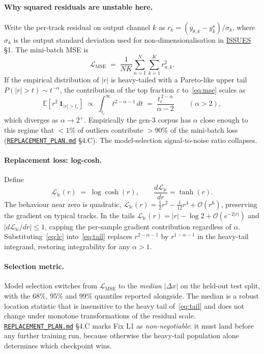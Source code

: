 \documentclass[11pt,a4paper]{article}
\newcommand{\loss}{\mathcal{L}}
\begin{document}
\paragraph{Why squared residuals are unstable here.} Write the per-track
residual on output channel $k$ as
$r_k = (y_{\theta,k} - y_k^\star)/\sigma_k$, where $\sigma_k$ is the output
standard deviation used for non-dimensionalisation in
\href{run:../../experiments/gen_2/ISSUES_WITH_PINNS_AND_RK_PINNS.md}{ISSUES} §1.
The mini-batch MSE is
\begin{equation}\label{eq:mse}
\loss_\mathrm{MSE} \;=\; \frac{1}{NK}\sum_{n=1}^{N}\sum_{k=1}^{K} r_{n,k}^{2}.
\end{equation}
If the empirical distribution of $|r|$ is heavy-tailed with a Pareto-like
upper tail $P(|r|>t)\sim t^{-\alpha}$, the contribution of the top
fraction $\varepsilon$ to~\eqref{eq:mse} scales as
\begin{equation}\label{eq:tail}
\mathbb{E}\!\left[r^2 \,\mathbf{1}_{|r|>t_\varepsilon}\right]
\;\propto\;
\int_{t_\varepsilon}^{\infty}\! t^{2-\alpha-1}\,dt
\;=\;
\frac{t_\varepsilon^{\,2-\alpha}}{\alpha-2}
\qquad (\alpha > 2),
\end{equation}
which diverges as $\alpha\to 2^{+}$. Empirically the gen-3 corpus has
$\alpha$ close enough to this regime that $<\!1\%$ of outliers contribute
$>\!90\%$ of the mini-batch loss
(\href{run:../../experiments/gen_3/REPLACEMENT_PLAN.md}{\texttt{REPLACEMENT\_PLAN.md}}
§4.C). The model-selection signal-to-noise ratio collapses.

\paragraph{Replacement loss: log-cosh.} Define
\begin{equation}\label{eq:lc}
\loss_\mathrm{lc}(r) \;=\; \log\cosh(r),\qquad
\frac{d\loss_\mathrm{lc}}{dr} = \tanh(r).
\end{equation}
The behaviour near zero is quadratic,
$\loss_\mathrm{lc}(r) = \tfrac{1}{2}r^2 - \tfrac{1}{12}r^4 + \mathcal{O}(r^6)$,
preserving the gradient on typical tracks. In the tails
$\loss_\mathrm{lc}(r) = |r| - \log 2 + \mathcal{O}(e^{-2|r|})$ and
$|d\loss_\mathrm{lc}/dr|\le 1$, capping the per-sample gradient
contribution regardless of $\alpha$. Substituting~\eqref{eq:lc}
into~\eqref{eq:tail} replaces $r^{2-\alpha-1}$ by $r^{1-\alpha-1}$ in the
heavy-tail integrand, restoring integrability for any $\alpha>1$.

\paragraph{Selection metric.} Model selection switches from
$\loss_\mathrm{MSE}$ to the \emph{median} $|\Delta x|$ on the held-out test
split, with the 68\%, 95\% and 99\% quantiles reported alongside. The median
is a robust location statistic that is insensitive to the heavy tail
of~\eqref{eq:tail} and does not change under monotone transformations of
the residual scale.
\href{run:../../experiments/gen_3/REPLACEMENT_PLAN.md}{\texttt{REPLACEMENT\_PLAN.md}}
§4.C marks Fix L1 as \emph{non-negotiable}: it must land before any further
training run, because otherwise the heavy-tail population alone determines
which checkpoint wins.
\end{document}
